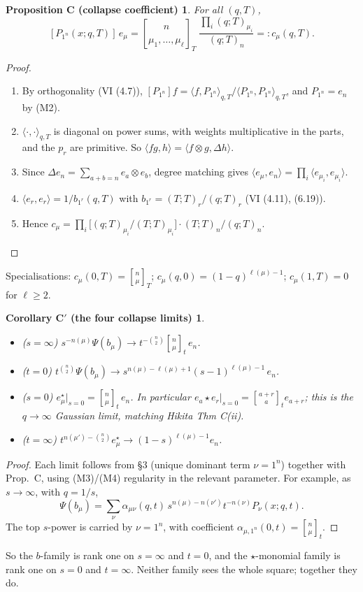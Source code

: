 \documentclass[11pt]{article}
\newtheorem*{propC}{Proposition C (collapse coefficient)}
\newtheorem*{corC}{Corollary C$'$ (the four collapse limits)}
\theoremstyle{definition}
\newcommand{\qbin}[2]{\genfrac{[}{]}{0pt}{}{#1}{#2}}
\begin{document}
\begin{propC}
For all $(q,T)$,
\[
[P_{1^n}(x;q,T)]\,e_\mu=\qbin{n}{\mu_1,\dots,\mu_\ell}_T\;\frac{\prod_i(q;T)_{\mu_i}}{(q;T)_n}=:c_\mu(q,T).
\]
\end{propC}
\begin{proof}
\begin{enumerate}[nosep]
\item By orthogonality (VI (4.7)), $[P_{1^n}]f=\langle f,P_{1^n}\rangle_{q,T}/\langle P_{1^n},P_{1^n}\rangle_{q,T}$, and $P_{1^n}=e_n$ by (M2).
\item $\langle\cdot,\cdot\rangle_{q,T}$ is diagonal on power sums, with weights multiplicative in the parts, and the $p_r$ are primitive. So $\langle fg,h\rangle=\langle f\otimes g,\Delta h\rangle$.
\item Since $\Delta e_n=\sum_{a+b=n}e_a\otimes e_b$, degree matching gives $\langle e_\mu,e_n\rangle=\prod_i\langle e_{\mu_i},e_{\mu_i}\rangle$.
\item $\langle e_r,e_r\rangle=1/b_{1^r}(q,T)$ with $b_{1^r}=(T;T)_r/(q;T)_r$ (VI (4.11), (6.19)).
\item Hence $c_\mu=\prod_i\bigl[(q;T)_{\mu_i}/(T;T)_{\mu_i}\bigr]\cdot(T;T)_n/(q;T)_n$.\qedhere
\end{enumerate}
\end{proof}
\noindent Specialisations: $c_\mu(0,T)=\qbin{n}{\mu}_T$; $c_\mu(q,0)=(1-q)^{\ell(\mu)-1}$; $c_\mu(1,T)=0$ for $\ell\ge2$.

\begin{corC}
\begin{itemize}[nosep]
\item ($s=\infty$) $s^{-n(\mu)}\Psi(b_\mu)\to t^{-\binom n2}\qbin{n}{\mu}_t\,e_n$.
\item ($t=0$) $t^{\binom n2}\Psi(b_\mu)\to s^{n(\mu)-\ell(\mu)+1}(s-1)^{\ell(\mu)-1}\,e_n$.
\item ($s=0$) $e^\star_\mu|_{s=0}=\qbin{n}{\mu}_t\,e_n$. In particular $e_a\star e_r|_{s=0}=\qbin{a+r}{a}_t e_{a+r}$; this is the $q\to\infty$ Gaussian limit, matching Hikita Thm C(ii).
\item ($t=\infty$) $t^{n(\mu')-\binom n2}e^\star_\mu\to(1-s)^{\ell(\mu)-1}e_n$.
\end{itemize}
\end{corC}
\begin{proof}
Each limit follows from \S3 (unique dominant term $\nu=1^n$) together with Prop.~C, using (M3)/(M4) regularity in the relevant parameter. For example, as $s\to\infty$, with $q=1/s$,\[\Psi(b_\mu)=\sum_\nu\alpha_{\mu\nu}(q,t)\,s^{n(\mu)-n(\nu')}t^{-n(\nu)}P_\nu(x;q,t).\] The top $s$-power is carried by $\nu=1^n$, with coefficient $\alpha_{\mu,1^n}(0,t)=\qbin{n}{\mu}_t$.
\end{proof}
So the $b$-family is rank one on $s=\infty$ and $t=0$, and the $\star$-monomial family is rank one on $s=0$ and $t=\infty$. Neither family sees the whole square; together they do.
\end{document}
